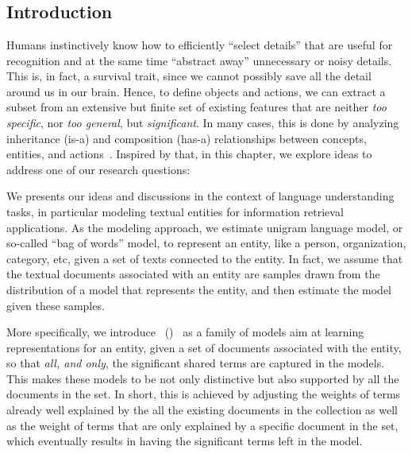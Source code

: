 \chapter{}
\label{chap:2}

\section{Introduction}
Humans instinctively know how to efficiently ``select details'' that are useful for recognition and at the same time ``abstract away'' unnecessary or noisy details.~\cite{tenenbaum2011grow, gentner1997structure, battaglia2018relational} 
This is, in fact, a survival trait, since we cannot possibly save all the detail around us in our brain. Hence, to define objects and actions, we can extract a subset from an extensive but finite set of existing features that are neither \emph{too specific}, nor \emph{too general}, but \emph{significant}. In many cases, this is done by analyzing inheritance (is-a) and composition (has-a) relationships between concepts, entities, and actions~\citep{goodwin2005reasoning, botvinick2008hierarchical}. 
Inspired by that, in this chapter, we explore ideas to address one of our research questions:


We presents our ideas and discussions in the context of language understanding tasks, in particular modeling textual entities for information retrieval applications. As the modeling approach, we estimate unigram language model, or so-called  ``bag of words'' model, to represent an entity, like a person, organization, category, etc, given a set of texts connected to the entity.  In fact, we assume that the textual documents associated with an entity are samples drawn from the distribution of a model that represents the entity, and then estimate the model given these samples.

More specifically, we introduce \textsl{\swlms}\ (\acswlm)~\cite{Dehghani:CIKM2016:long, Dehghani:2016:CHIIR, Dehghani2016:trec} as a family of models aim at learning representations for an entity, given a set of documents associated with the entity, so that \emph{all, and only}, the significant shared terms are captured in the models. This makes these models to be not only distinctive but also supported by all the documents in the set. In short, this is achieved by adjusting the weights of terms already well explained by the all the existing documents in the collection as well as the weight of terms that are only explained by a specific document in the set, which eventually results in having the significant terms left in the model. 


